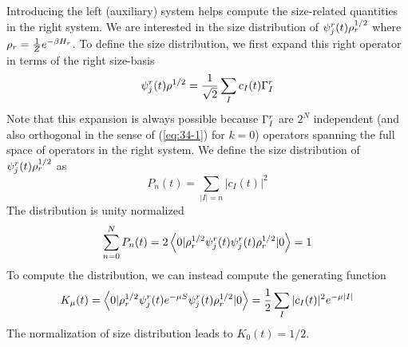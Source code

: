 \documentclass[11pt]{article}
\renewcommand{\>}{\rangle}
\newcommand{\<}{\langle}
\begin{document}
Introducing the left (auxiliary) system helps compute the size-related
quantities in the right system. We are interested in the size distribution
of $\psi_{j}^{r}(t)\rho_{r}^{1/2}$ where $\rho_{r}=\frac{1}{Z}e^{-\beta H_{r}}$.
To define the size distribution, we first expand this right operator
in terms of the right size-basis
\begin{equation}
\psi_{j}^{r}(t)\rho^{1/2}=\frac{1}{\sqrt{2}}\sum_{I}c_{I}(t)\Gamma_{I}^{r}\label{eq:32}
\end{equation}
Note that this expansion is always possible because $\Gamma_{I}^{r}$
are $2^{N}$ independent (and also orthogonal in the sense of (\ref{eq:34-1})
for $k=0$) operators spanning the full space of operators in the
right system. We define the size distribution of $\psi_{j}^{r}(t)\rho_{r}^{1/2}$
as 
\begin{equation}
P_{n}(t)=\sum_{|I|=n}|c_{I}(t)|^{2}
\end{equation}
The distribution is unity normalized 
\begin{equation}
\sum_{n=0}^{N}P_{n}(t)=2\left\langle 0|\rho_{r}^{1/2}\psi_{j}^{r}(t)\psi_{j}^{r}(t)\rho_{r}^{1/2}|0\right\rangle=1
\end{equation}
To compute the distribution, we can instead compute the generating
function \cite{Qi:2018bje}
\begin{equation}
K_{\mu}(t)=\left\langle 0|\rho_{r}^{1/2}\psi_{j}^{r}(t)e^{-\mu S}\psi_{j}^{r}(t)\rho_{r}^{1/2}|0\right\rangle=\frac{1}{2}\sum_{I}|c_{I}(t)|^{2}e^{-\mu|I|}\label{eq:33-3}
\end{equation}
The normalization of size distribution leads to $K_{0}(t)=1/2$. 
\end{document}
